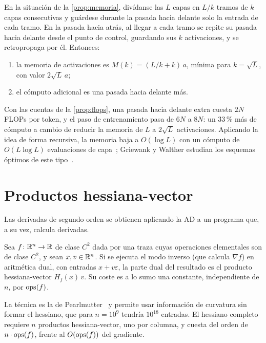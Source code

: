\begin{proposicion}\label{prop:checkpoint}
En la situación de la \cref{prop:memoria}, divídanse las $L$ capas en $L/k$ tramos de $k$ capas consecutivas y guárdese durante la pasada hacia delante solo la entrada de cada tramo. En la pasada hacia atrás, al llegar a cada tramo se repite su pasada hacia delante desde el punto de control, guardando sus $k$ activaciones, y se retropropaga por él. Entonces:
\begin{enumerate}
  \item la memoria de activaciones es $M(k)=(L/k+k)\,a$, mínima para $k=\sqrt L$, con valor $2\sqrt L\,a$;
  \item el cómputo adicional es una pasada hacia delante más.
\end{enumerate}
\end{proposicion}

Con las cuentas de la \cref{prop:flops}, una pasada hacia delante extra cuesta $2N$ FLOPs por token, y el paso de entrenamiento pasa de $6N$ a $8N$: un 33\,\% más de cómputo a cambio de reducir la memoria de $L$ a $2\sqrt L$ activaciones. Aplicando la idea de forma recursiva, la memoria baja a $O(\log L)$ con un cómputo de $O(L\log L)$ evaluaciones de capa~\cite{chen}; Griewank y Walther estudian los esquemas óptimos de este tipo~\cite[cap.~12]{gw}.

\addtocounter{definicion}{1}%

\section{Productos hessiana-vector}

Las derivadas de segundo orden se obtienen aplicando la AD a un programa que, a su vez, calcula derivadas.

\begin{proposicion}\label{prop:hvp}
Sea $f\colon\mathbb{R}^{n}\to\mathbb{R}$ de clase $C^{2}$ dada por una traza cuyas operaciones elementales son de clase $C^{2}$, y sean $x,v\in\mathbb{R}^{n}$. Si se ejecuta el modo inverso (que calcula $\nabla f$) en aritmética dual, con entradas $x+v\varepsilon$, la parte dual del resultado es el producto hessiana-vector $H_f(x)\,v$. Su coste es a lo sumo una constante, independiente de $n$, por $\operatorname{ops}(f)$.
\end{proposicion}

\addtocounter{definicion}{1}%

La técnica es la de Pearlmutter~\cite{pearlmutter} y permite usar información de curvatura sin formar el hessiano, que para $n=10^{9}$ tendría $10^{18}$ entradas. El hessiano completo requiere $n$ productos hessiana-vector, uno por columna, y cuesta del orden de $n\cdot\operatorname{ops}(f)$, frente al $O(\operatorname{ops}(f))$ del gradiente.

